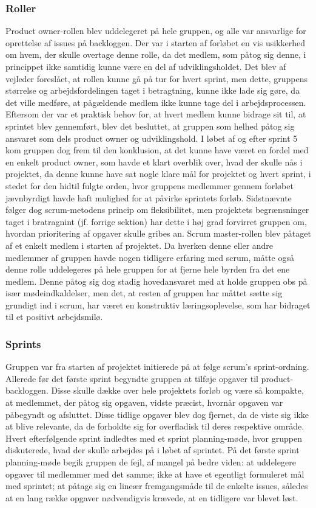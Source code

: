 \subsubsection{Roller}
Product owner-rollen blev uddelegeret på hele gruppen, og alle var ansvarlige for oprettelse af issues på backloggen. Der var i starten af forløbet en vis
usikkerhed om hvem, der skulle overtage denne rolle, da det medlem, som påtog sig denne, i princippet ikke samtidig kunne være en del af udviklingsholdet.
Det blev af vejleder foreslået, at rollen kunne gå på tur for hvert sprint, men dette, gruppens størrelse og arbejdsfordelingen taget i betragtning, kunne
ikke lade sig gøre, da det ville medføre, at pågældende medlem ikke kunne tage del i arbejdsprocessen. Eftersom der var et praktisk behov for, at hvert medlem
kunne bidrage sit til, at sprintet blev gennemført, blev det besluttet, at gruppen som helhed påtog sig ansvaret som dels product owner og udviklingshold.
I løbet af og efter sprint 5 kom gruppen dog frem til den konklusion, at det kunne have været en fordel med en enkelt product owner, som havde et klart overblik
over, hvad der skulle nås i projektet, da denne kunne have sat nogle klare mål for projektet og hvert sprint, i stedet for den hidtil fulgte orden, hvor gruppens
medlemmer gennem forløbet jævnbyrdigt havde haft mulighed for at påvirke sprintets forløb. Sidstnævnte følger dog scrum-metodens princip om fleksibilitet, men
projektets begrænsninger taget i bratragnint (jf. forrige sektion) har dette i høj grad forvirret gruppen om, hvordan prioritering af opgaver skulle gribes an.
Scrum master-rollen blev påtaget af et enkelt medlem i starten af projektet. Da hverken denne eller andre medlemmer af gruppen havde nogen tidligere erfaring med
scrum, måtte også denne rolle uddelegeres på hele gruppen for at fjerne hele byrden fra det ene medlem. Denne påtog sig dog stadig hovedansvaret med at holde gruppen
obs på især mødeindkaldelser, men det, at resten af gruppen har måttet sætte sig grundigt ind i scrum, har været en konstruktiv læringsoplevelse, som har bidraget
til et positivt arbejdsmilø.

\subsubsection{Sprints}
Gruppen var fra starten af projektet initierede på at følge scrum's sprint-ordning. Allerede før det første sprint begyndte gruppen at tilføje opgaver til product-
backloggen. Disse skulle dække over hele projektets forløb og være så kompakte, at medlemmet, der påtog sig opgaven, vidste præcist, hvornår opgaven var påbegyndt
og afsluttet. Disse tidlige opgaver blev dog fjernet, da de viste sig ikke at blive relevante, da de forholdte sig for overfladisk til deres respektive område.
Hvert efterfølgende sprint indledtes med et sprint planning-møde, hvor gruppen diskuterede, hvad der skulle arbejdes på i løbet af sprintet. På det første sprint
planning-møde begik gruppen de fejl, af mangel på bedre viden: at uddelegere opgaver til medlemmer med det samme; ikke at have et egentligt formuleret mål med
sprintet; at påtage sig en lineær fremgangsmåde til de enkelte issues, således at en lang række opgaver nødvendigvis krævede, at en tidligere var blevet løst.

